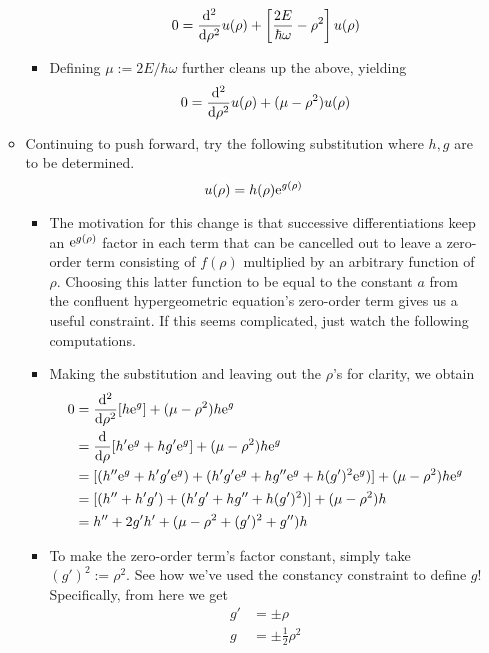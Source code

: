 \documentclass[../finalProject.tex]{subfiles}
\begin{document}
\begin{itemize}
\begin{itemize}
\begin{itemize}
\begin{equation*}
                0 = \dv[2]{\rho}u(\rho)+\left[ \frac{2E}{\hbar\omega}-\rho^2 \right]u(\rho)
            \end{equation*}
            \item Defining $\mu:=2E/\hbar\omega$ further cleans up the above, yielding
            \begin{equation*}
                0 = \dv[2]{\rho}u(\rho)+(\mu-\rho^2)u(\rho)
            \end{equation*}
        \end{itemize}
        \item Continuing to push forward, try the following substitution where $h,g$ are to be determined.
        \begin{equation*}
            u(\rho) = h(\rho)\e[g(\rho)]
        \end{equation*}
        \begin{itemize}
            \item The motivation for this change is that successive differentiations keep an $\e[g(\rho)]$ factor in each term that can be cancelled out to leave a zero-order term consisting of $f(\rho)$ multiplied by an arbitrary function of $\rho$. Choosing this latter function to be equal to the constant $a$ from the confluent hypergeometric equation's zero-order term gives us a useful constraint. If this seems complicated, just watch the following computations.
            \item Making the substitution and leaving out the $\rho$'s for clarity, we obtain
            \begin{align*}
                0 &= \dv[2]{\rho}[h\e[g]]+(\mu-\rho^2)h\e[g]\\
                &= \dv{\rho}[h'\e[g]+hg'\e[g]]+(\mu-\rho^2)h\e[g]\\
                &= [(h''\e[g]+h'g'\e[g])+(h'g'\e[g]+hg''\e[g]+h(g')^2\e[g])]+(\mu-\rho^2)h\e[g]\\
                &= [(h''+h'g')+(h'g'+hg''+h(g')^2)]+(\mu-\rho^2)h\\
                &= h''+2g'h'+(\mu-\rho^2+(g')^2+g'')h
            \end{align*}
            \item To make the zero-order term's factor constant, simply take $(g')^2:=\rho^2$. See how we've used the constancy constraint to define $g$! Specifically, from here we get
            \begin{align*}
                g' &= \pm\rho\\
                g &= \pm\frac{1}{2}\rho^2

\end{align*}
\end{itemize}
\end{itemize}
\end{itemize}
\end{document}
